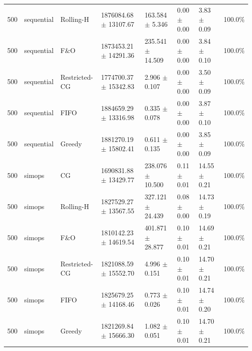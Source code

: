 \begin{tabular}{rlllllll}
500 & sequential & Rolling-H & 1876084.68 $\pm$ 13107.67 & 163.584 $\pm$ 5.346 & 0.00 $\pm$ 0.00 & 3.83 $\pm$ 0.09 & 100.0\% \\
500 & sequential & F\&O & 1873453.21 $\pm$ 14291.36 & 235.541 $\pm$ 14.509 & 0.00 $\pm$ 0.00 & 3.84 $\pm$ 0.10 & 100.0\% \\
500 & sequential & Restricted-CG & 1774700.37 $\pm$ 15342.83 & 2.906 $\pm$ 0.107 & 0.00 $\pm$ 0.00 & 3.50 $\pm$ 0.09 & 100.0\% \\
500 & sequential & FIFO & 1884659.29 $\pm$ 13316.98 & 0.335 $\pm$ 0.078 & 0.00 $\pm$ 0.00 & 3.87 $\pm$ 0.10 & 100.0\% \\
500 & sequential & Greedy & 1881270.19 $\pm$ 15802.41 & 0.611 $\pm$ 0.135 & 0.00 $\pm$ 0.00 & 3.85 $\pm$ 0.09 & 100.0\% \\
500 & simops & CG & 1690831.88 $\pm$ 13429.77 & 238.076 $\pm$ 10.500 & 0.11 $\pm$ 0.01 & 14.55 $\pm$ 0.21 & 100.0\% \\
500 & simops & Rolling-H & 1827529.27 $\pm$ 13567.55 & 327.121 $\pm$ 24.439 & 0.08 $\pm$ 0.00 & 14.73 $\pm$ 0.19 & 100.0\% \\
500 & simops & F\&O & 1810142.23 $\pm$ 14619.54 & 401.871 $\pm$ 28.877 & 0.10 $\pm$ 0.01 & 14.69 $\pm$ 0.21 & 100.0\% \\
500 & simops & Restricted-CG & 1821088.59 $\pm$ 15552.70 & 4.996 $\pm$ 0.151 & 0.10 $\pm$ 0.01 & 14.70 $\pm$ 0.21 & 100.0\% \\
500 & simops & FIFO & 1825679.25 $\pm$ 14168.46 & 0.773 $\pm$ 0.026 & 0.10 $\pm$ 0.01 & 14.74 $\pm$ 0.20 & 100.0\% \\
500 & simops & Greedy & 1821269.84 $\pm$ 15666.30 & 1.082 $\pm$ 0.051 & 0.10 $\pm$ 0.01 & 14.70 $\pm$ 0.21 & 100.0\% \\
\bottomrule
\end{tabular}

